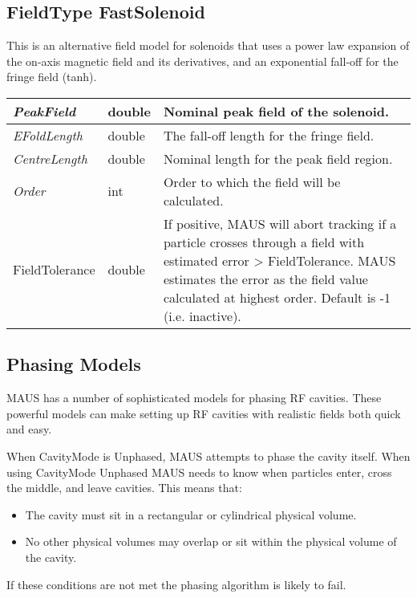 \subsection{FieldType FastSolenoid}
This is an alternative field model for solenoids that uses a power law expansion of the on-axis magnetic field and its
derivatives, and an exponential fall-off for the fringe field (tanh).

\begin{center}
\tabletail{}
\tablelasttail{}
\begin{supertabular}{|m{3.665cm}|m{1.278cm}|m{12.052cm}|}
\hline
{\itshape PeakField} &
double &
Nominal peak field of the solenoid.\\\hline
{\itshape EFoldLength} &
double &
The fall-off length for the fringe field.\\\hline
{\itshape CentreLength} &
double &
Nominal length for the peak field region.\\\hline
{\itshape Order} &
int &
Order to which the field will be calculated.\\\hline
FieldTolerance &
double &
If positive, MAUS will abort tracking if a particle crosses through a field with estimated error {\textgreater}
FieldTolerance. MAUS estimates the error as the field value calculated at highest order. Default is -1 (i.e.
inactive).\\\hline
\end{supertabular}
\end{center}
\subsection{Phasing Models}
MAUS has a number of sophisticated models for phasing RF cavities. These powerful models can make setting up RF
cavities with realistic fields both quick and easy.

When CavityMode is Unphased, MAUS attempts to phase the cavity itself. When using CavityMode Unphased MAUS needs to
know when particles enter, cross the middle, and leave cavities. This means that:

\liststyleLxiii
\begin{itemize}
\item The cavity must sit in a rectangular or cylindrical physical volume.
\item No other physical volumes may overlap or sit within the physical volume of the cavity.
\end{itemize}
If these conditions are not met the phasing algorithm is likely to fail.

